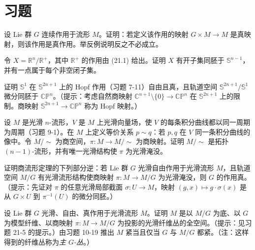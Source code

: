 \documentclass[../../main.tex]{subfiles}
\begin{document}
\section{习题}\label{section:ch21-problems}

\begin{exercise}\label{exercise:ch21-1}
设 Lie 群 $G$ 连续作用于流形 $M$。证明：若定义该作用的映射 $G\times M\to M$ 是真映射，则该作用是真作用。举反例说明反之不必成立。
\end{exercise}

\begin{exercise}\label{exercise:ch21-2}
令 $X=\mathbb{R}^n/\mathbb{R}^+$，其中 $\mathbb{R}^+$ 的作用由 (21.1) 给出。证明 $X$ 有开子集同胚于 $\mathbb{S}^{n-1}$，并有一点属于每个非空闭子集。
\end{exercise}

\begin{exercise}\label{exercise:ch21-3}
证明 $\mathbb{S}^1$ 在 $\mathbb{S}^{2n+1}$ 上的 Hopf 作用（习题 7-11）自由且真，且轨道空间 $\mathbb{S}^{2n+1}/\mathbb{S}^1$ 微分同胚于 $\mathbb{CP}^n$。（提示：考虑自然商映射 $\mathbb{C}^{n+1}\setminus\{0\}\to\mathbb{CP}^n$ 在 $\mathbb{S}^{2n+1}$ 上的限制。商映射 $\mathbb{S}^{2n+1}\to\mathbb{CP}^n$ 称为 Hopf 映射。）
\end{exercise}

\begin{exercise}\label{exercise:ch21-4}
设 $M$ 是光滑 $n$-流形，$V$ 是 $M$ 上光滑向量场，使 $V$ 的每条积分曲线都以同一周期为周期（习题 9-1）。在 $M$ 上定义等价关系 $p\sim q$：若 $p,q$ 在 $V$ 同一条积分曲线的像中。令 $M/\sim$ 为商空间，$\pi\colon M\to M/\sim$ 为商映射。证明 $M/\sim$ 是拓扑 $(n-1)$-流形，并有唯一光滑结构使 $\pi$ 为光滑淹没。
\end{exercise}

\begin{exercise}\label{exercise:ch21-5}
证明商流形定理的下列部分逆：若 Lie 群 $G$ 光滑自由作用于光滑流形 $M$，且轨道空间 $M/G$ 有光滑流形结构使商映射 $\pi\colon M\to M/G$ 为光滑淹没，则 $G$ 的作用真。（提示：先证对 $\pi$ 的任意光滑局部截面 $\sigma\colon U\to M$，映射 $(g,x)\mapsto g\cdot\sigma(x)$ 是从 $G\times U$ 到 $\pi^{-1}(U)$ 的微分同胚。）
\end{exercise}

\begin{exercise}\label{exercise:ch21-6}
设 Lie 群 $G$ 光滑、自由、真作用于光滑流形 $M$。证明 $M$ 是以 $M/G$ 为底、以 $G$ 为模型纤维、以商映射 $\pi\colon M\to M/G$ 为投影的光滑纤维丛的全空间。（提示：见习题 21-5 的提示。）由习题 10-19 推出 $M$ 紧当且仅当 $G$ 与 $M/G$ 都紧。（注：这样得到的纤维丛称为\emph{主 $G$-丛}。）
\end{exercise}
\end{document}
